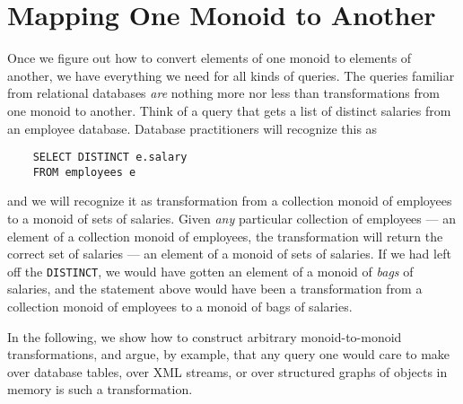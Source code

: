 \section{\color{Red}Mapping One Monoid to Another}


Once we figure out how to convert elements of one monoid to elements of another, we have everything we need for all kinds of queries. The queries familiar from relational databases \emph{are} nothing more nor less than transformations from one monoid to another. Think of a query that gets a list of distinct salaries from an employee database. Database practitioners will recognize this as
\begin{center}
  \begin{verbatim}
    SELECT DISTINCT e.salary
    FROM employees e
  \end{verbatim}
\end{center}
and we will recognize it as transformation from a collection monoid of employees to a monoid of sets of salaries. Given \emph{any} particular collection of employees --- an element of a collection monoid of employees, the transformation will return the correct set of salaries --- an element of a monoid of sets of salaries. If we had left off the \verb"DISTINCT", we would have gotten an element of a monoid of \emph{bags} of salaries, and the statement above would have been a transformation from a collection monoid of employees to a monoid of bags of salaries. 


In the following, we show how to construct arbitrary monoid-to-monoid transformations, and argue, by example, that any query one would care to make over database tables, over XML streams, or over structured graphs of objects in memory is such a transformation. 



